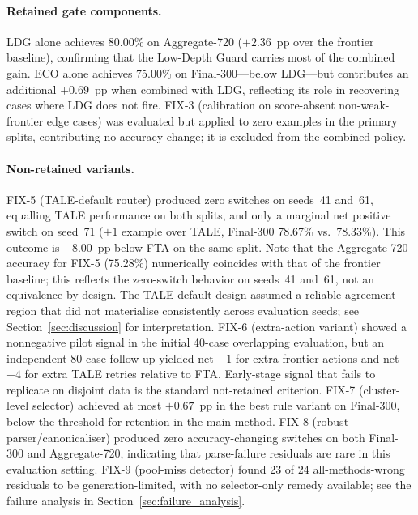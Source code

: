 \documentclass[smallcondensed]{svjour3}
\begin{document}
\paragraph{Retained gate components.}
LDG alone achieves 80.00\% on Aggregate-720 ($+2.36$~pp over the frontier
baseline), confirming that the Low-Depth Guard carries most of the combined
gain.
ECO alone achieves 75.00\% on Final-300---below LDG---but contributes an
additional $+0.69$~pp when combined with LDG, reflecting its role in
recovering cases where LDG does not fire.
FIX-3 (calibration on score-absent non-weak-frontier edge cases) was
evaluated but applied to zero examples in the primary splits, contributing
no accuracy change; it is excluded from the combined policy.

\paragraph{Non-retained variants.}
FIX-5 (TALE-default router) produced zero switches on seeds~41 and~61,
equalling TALE performance on both splits, and only a marginal net positive
switch on seed~71 ($+1$ example over TALE, Final-300 78.67\% vs.\ 78.33\%).
This outcome is $-8.00$~pp below FTA on the same split.
Note that the Aggregate-720 accuracy for FIX-5 (75.28\%) numerically
coincides with that of the frontier baseline; this reflects the zero-switch
behavior on seeds~41 and~61, not an equivalence by design.
The TALE-default design assumed a reliable agreement region that did not
materialise consistently across evaluation seeds; see
Section~\ref{sec:discussion} for interpretation.
FIX-6 (extra-action variant) showed a nonnegative pilot signal in the
initial 40-case overlapping evaluation, but an independent 80-case follow-up
yielded net $-1$ for extra frontier actions and net $-4$ for extra TALE
retries relative to FTA.
Early-stage signal that fails to replicate on disjoint data is the standard
not-retained criterion.
FIX-7 (cluster-level selector) achieved at most $+0.67$~pp in the best rule
variant on Final-300, below the threshold for retention in the main method.
FIX-8 (robust parser/canonicaliser) produced zero accuracy-changing switches
on both Final-300 and Aggregate-720, indicating that parse-failure residuals
are rare in this evaluation setting.
FIX-9 (pool-miss detector) found 23 of 24 all-methods-wrong residuals to be
generation-limited, with no selector-only remedy available; see the failure
analysis in Section~\ref{sec:failure_analysis}.
\end{document}
